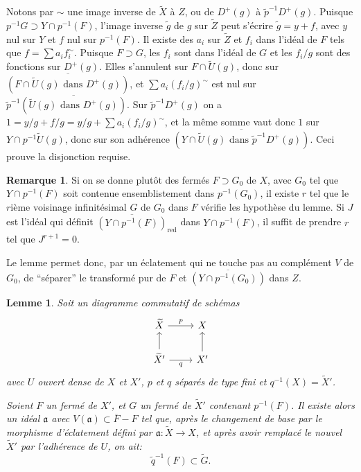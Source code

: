 \documentclass[11pt,a4paper]{article}
\theoremstyle{plain}
\newtheorem{lemma}[theorem]{Lemme}
\theoremstyle{definition}
\newtheorem{remark}[theorem]{Remarque}
\begin{document}
Notons par $\sim$ une image inverse de $\widetilde{X}$ \`a $Z$, ou de $D^+(g)$ \`a $\tilde{p}^{-1}D^+(g)$. Puisque $p^{-1}G \supset Y \cap p^{-1}(F)$, l'image inverse $\tilde{g}$ de $g$ sur $\widetilde{Z}$ peut s'\'ecrire $\tilde{g} = y + f$, avec $y$ nul sur $Y$ et $f$ nul sur $p^{-1}(F)$. Il existe des $a_i$ sur $\widetilde{Z}$ et $f_i$ dans l'id\'eal de $F$ tels que $f = \sum a_i f_i^{\sim}$. Puisque $F \supset G$, les $f_i$ sont dans l'id\'eal de $G$ et les $f_i/g$ sont des fonctions sur $D^+(g)$. Elles s'annulent sur $F \cap \widetilde{U}(g)$, donc sur $\overline{(F \cap \widetilde{U}(g) \text{ dans } D^+(g))}$, et $\sum a_i (f_i/g)^{\sim}$ est nul sur $\tilde{p}^{-1}\overline{(\widetilde{U}(g) \text{ dans } D^+(g))}$. Sur $\tilde{p}^{-1}D^+(g)$ on a $1 = y/g + f/g = y/g + \sum a_i (f_i/g)^{\sim}$, et la m\^eme somme vaut donc $1$ sur $Y \cap p^{-1}\widetilde{U}(g)$, donc sur son adh\'erence $\overline{(Y \cap \widetilde{U}(g) \text{ dans } \tilde{p}^{-1}D^+(g))}$. Ceci prouve la disjonction requise.

\begin{remark}
Si on se donne plut\^ot des ferm\'es $F \supset G_0$ de $X$, avec $G_0$ tel que $Y \cap p^{-1}(F)$ soit contenue ensemblistement dans $p^{-1}(G_0)$, il existe $r$ tel que le $r$i\`eme voisinage infinit\'esimal $G$ de $G_0$ dans $F$ v\'erifie les hypoth\`ese du lemme. Si $J$ est l'id\'eal qui d\'efinit $\overline{(Y \cap p^{-1}(F))}_{\text{red}}$ dans $Y \cap p^{-1}(F)$, il suffit de prendre $r$ tel que $J^{r+1} = 0$.

Le lemme permet donc, par un \'eclatement qui ne touche pas au compl\'ement $V$ de $G_0$, de ``s\'eparer'' le transform\'e pur de $F$ et $\overline{(Y \cap p^{-1}(G_0))}$ dans $Z$.
\end{remark}

\begin{lemma}
Soit un diagramme commutatif de sch\'emas
\[
\begin{tikzcd}
\widetilde{X} \arrow[r, "p"] & X \\
\widetilde{X}' \arrow[u] \arrow[r, "q"'] & X' \arrow[u]
\end{tikzcd}
\]
avec $U$ ouvert dense de $X$ et $X'$, $p$ et $q$ s\'epar\'es de type fini et $q^{-1}(X) = \widetilde{X}'$.

Soient $F$ un ferm\'e de $X'$, et $G$ un ferm\'e de $\widetilde{X}'$ contenant $p^{-1}(F)$. Il existe alors un id\'eal $\mathfrak{a}$ avec $V(\mathfrak{a}) \subset \overline{F} - F$ tel que, apr\`es le changement de base par le morphisme d'\'eclatement d\'efini par $\mathfrak{a}: \widetilde{X} \to X$, et apr\`es avoir remplac\'e le nouvel $\widetilde{X}'$ par l'adh\'erence de $U$, on ait:
\[
\widetilde{q}^{-1}(F) \subset \widetilde{G}.
\]
\end{lemma}
\end{document}
